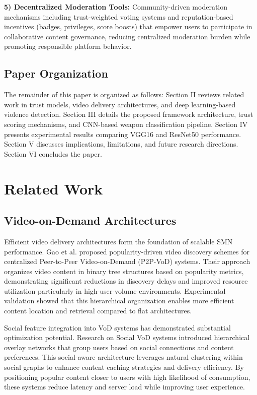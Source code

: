 \documentclass[conference]{IEEEtran}
\begin{document}
\textbf{5) Decentralized Moderation Tools:} Community-driven moderation mechanisms including trust-weighted voting systems and reputation-based incentives (badges, privileges, score boosts) that empower users to participate in collaborative content governance, reducing centralized moderation burden while promoting responsible platform behavior.

\subsection{Paper Organization}

The remainder of this paper is organized as follows: Section II reviews related work in trust models, video delivery architectures, and deep learning-based violence detection. Section III details the proposed framework architecture, trust scoring mechanisms, and CNN-based weapon classification pipeline. Section IV presents experimental results comparing VGG16 and ResNet50 performance. Section V discusses implications, limitations, and future research directions. Section VI concludes the paper.
\vspace{-4mm}
\section{Related Work}

\subsection{Video-on-Demand Architectures}

Efficient video delivery architectures form the foundation of scalable SMN performance. Gao et al. \cite{gao2016popularity} proposed popularity-driven video discovery schemes for centralized Peer-to-Peer Video-on-Demand (P2P-VoD) systems. Their approach organizes video content in binary tree structures based on popularity metrics, demonstrating significant reductions in discovery delays and improved resource utilization particularly in high-user-volume environments. Experimental validation showed that this hierarchical organization enables more efficient content location and retrieval compared to flat architectures.

Social feature integration into VoD systems has demonstrated substantial optimization potential. Research on Social VoD systems \cite{social2015vod} introduced hierarchical overlay networks that group users based on social connections and content preferences. This social-aware architecture leverages natural clustering within social graphs to enhance content caching strategies and delivery efficiency. By positioning popular content closer to users with high likelihood of consumption, these systems reduce latency and server load while improving user experience.
\end{document}
